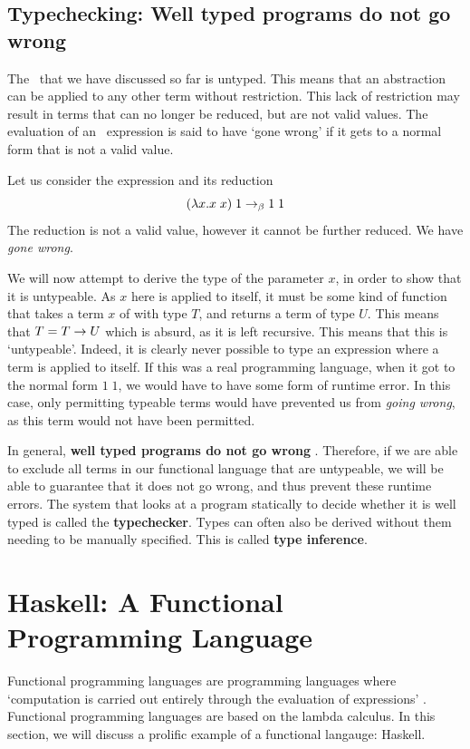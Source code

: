

\subsection{Typechecking: Well typed programs do not go wrong}
The \lcalc\ that we have discussed so far is untyped. This means that an abstraction can be applied to any other term without restriction. This lack of restriction may result in terms that can no longer be reduced, but are not valid values. The evaluation of an \lcalc\ expression is said to have `gone wrong' if it gets to a normal form that is not a valid value.

Let us consider the expression and its reduction
\[
(\lambda x. x\;x) \;1 \rightarrow_\beta 1\;1
\]
\noindent The reduction is not a valid value, however it cannot be further reduced. We have \textit{gone wrong}.

We will now attempt to derive the type of the parameter $x$, in order to show that it is untypeable.
As $x$ here is applied to itself, it must be some kind of function that takes a term $x$ of with type $T$, and returns a term of type $U$. This means that $T = T \rightarrow U$ which is absurd, as it is left recursive. This means that this is `untypeable'. Indeed, it is clearly never possible to type an expression where a term is applied to itself. If this was a real programming language, when it got to the normal form \(1\;1\), we would have to have some form of runtime error. In this case, only permitting typeable terms would have prevented us from \textit{going wrong}, as this term would not have been permitted. 

In general, \textbf{well typed programs do not go wrong} \cite{MILNER1978348}. Therefore, if we are able to exclude all terms in our functional language that are untypeable, we will be able to guarantee that it does not go wrong, and thus prevent these runtime errors. The system that looks at a program statically to decide whether it is well typed is called the \textbf{typechecker}. Types can often also be derived without them needing to be manually specified. This is called \textbf{type inference}.

\section{Haskell: A Functional Programming Language}
Functional programming languages are programming languages where `computation is carried out entirely through the evaluation of expressions' \cite{hudak1989conceptionfunctionalprogranning}. Functional programming languages are based on the lambda calculus. In this section, we will discuss a prolific example of a functional langauge: Haskell. 

